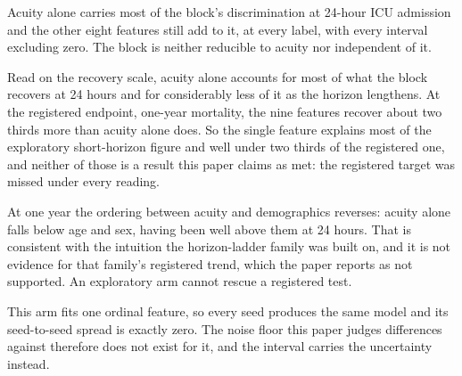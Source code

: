 \begin{table}[t]
\begin{tabular}{llll}
\bottomrule
\end{tabular}
\par\footnotesize Acuity alone carries most of the block's discrimination at 24-hour ICU admission and the other eight features still add to it, at every label, with every interval excluding zero. The block is neither reducible to acuity nor independent of it.
\par\footnotesize Read on the recovery scale, acuity alone accounts for most of what the block recovers at 24 hours and for considerably less of it as the horizon lengthens. At the registered endpoint, one-year mortality, the nine features recover about two thirds more than acuity alone does. So the single feature explains most of the exploratory short-horizon figure and well under two thirds of the registered one, and neither of those is a result this paper claims as met: the registered target was missed under every reading.
\par\footnotesize At one year the ordering between acuity and demographics reverses: acuity alone falls below age and sex, having been well above them at 24 hours. That is consistent with the intuition the horizon-ladder family was built on, and it is not evidence for that family's registered trend, which the paper reports as not supported. An exploratory arm cannot rescue a registered test.
\par\footnotesize This arm fits one ordinal feature, so every seed produces the same model and its seed-to-seed spread is exactly zero. The noise floor this paper judges differences against therefore does not exist for it, and the interval carries the uncertainty instead.
\end{table}

